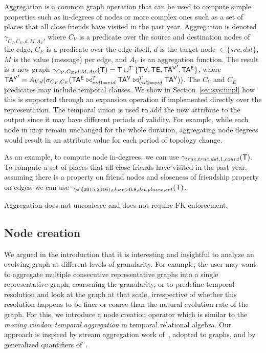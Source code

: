 Aggregation is a common graph operation that can be used to compute
simple properties such as in-degrees of nodes or more complex ones
such as a set of places that all close friends have visited in the
past year.  Aggregation is denoted $\gamma_{C_V,C_E,d,M,A_V}$, where
$C_V$ is a predicate over the source and destination nodes of the
edge, $C_E$ is a predicate over the edge itself, $d$ is the target
node $\in \{src,dst\}$, $M$ is the value (message) per edge, and $A_V$
is an aggregation function.  The result is a new graph
$\gamma_{C_V,C_E,d,M,A_V} (\mathsf{T}) = \mathsf{T} \cup^T \{ \textsf{TV}, \textsf{TE}, \mathsf{TA^{V}}',
\mathsf{TA^{E}} \}$, where $\mathsf{TA^{V}}' = A_{V,d}(\sigma_{C_V,C_E} (\mathsf{TA^{E}}
\bowtie^T_{vid1=vid} \mathsf{TA^{V}} \bowtie^T_{vid2=vid} \mathsf{TA^{V}}))$.  The $C_V$ and
$C_E$ predicates may include temporal clauses.  We show in
Section~\ref{sec:sys:impl} how this is supported through an expansion
operation if implemented directly over the \tve representation.  The
temporal union is used to add the new attribute to the output since it
may have different periods of validity.  For example, while each node
in \tg may remain unchanged for the whole duration, aggregating node
degrees would result in an attribute value for each period of topology
change.

As an example, to compute node in-degrees, we can use
$\gamma_{true,true,dst,1,count}(\mathsf{T})$.  To compute a set of places
that all close friends have visited in the past year, assuming there
is a property  on friend nodes and closeness of
friendship property on edges, we can use $\gamma_{p \cap
  [2015,2016),close > 0.8,dst,places,set}(\mathsf{T})$.

Aggregation does not uncoalesce and does not require FK enforcement.

\subsection{Node creation}
\label{sec:algebra:create}

We argued in the introduction that it is interesting and insightful to
analyze an evolving graph at different levels of granularity.  For
example, the user may want to aggregate multiple consecutive
representative graphs into a single representative graph, coarsening
the granularity, or to predefine temporal resolution and look at the
graph at that scale, irrespective of whether this resolution happens
to be finer or coarse than the natural evolution rate of the graph.
For this, we introduce a node creation operator which is similar to
the {\em moving window temporal aggregation} in temporal relational
algebra.  Our approach is inspired by stream aggregation work
of~\cite{Li2005}, adopted to graphs, and by generalized quantifiers
of~\cite{Hsu1995}.

